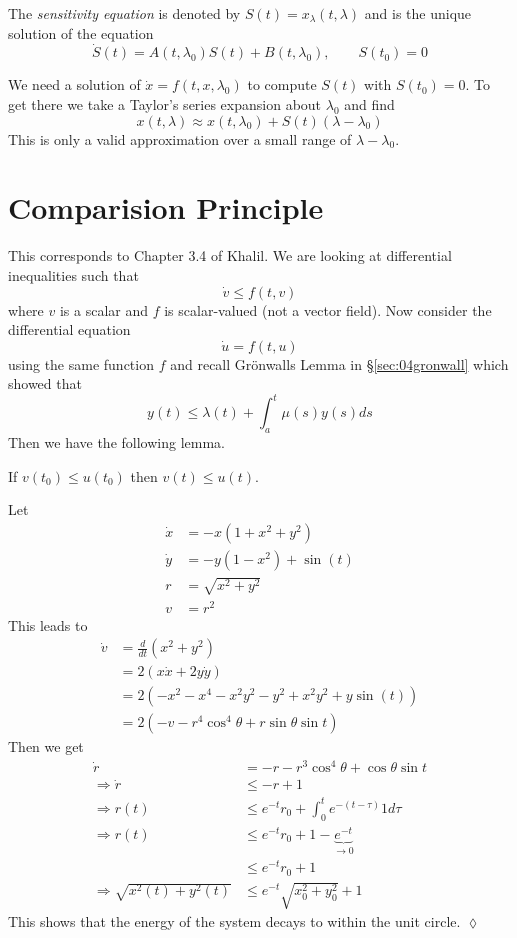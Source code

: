 The \textit{sensitivity equation} is denoted by $S(t) = x_\lambda(t,\lambda)$ and is the unique solution of the equation
$$\dot{S}(t) = A(t,\lambda_0)S(t) + B(t,\lambda_0), \qquad S(t_0) = 0$$

We need a solution of $\dot{x}=f(t,x,\lambda_0)$ to compute $S(t)$ with $S(t_0)=0$. To get there we take a Taylor's series expansion about $\lambda_0$ and find
$$x(t,\lambda) \approx x(t,\lambda_0) + S(t)(\lambda-\lambda_0)$$
This is only a valid approximation over a small range of $\lambda-\lambda_0$.

\section{Comparision Principle}
This corresponds to Chapter 3.4 of Khalil. We are looking at differential inequalities such that
$$\dot{v}\leq f(t,v)$$
where $v$ is a scalar and $f$ is scalar-valued (not a vector field). Now consider the differential equation
$$\dot{u} = f(t,u)$$
using the same function $f$ and recall Gr\"onwalls Lemma in \S\ref{sec:04gronwall} which showed that
$$y(t) \leq \lambda(t) + \int_a^t\mu(s)y(s)ds$$
Then we have the following lemma.

\begin{lemma}
If $v(t_0)\leq u(t_0)$ then $v(t)\leq u(t)$.
\end{lemma}

\begin{example}
Let
\begin{align*}
\dot{x} &= -x(1+x^2+y^2) \\
\dot{y} &= -y(1-x^2)+\sin(t) \\
r &= \sqrt{x^2+y^2} \\
v &= r^2
\end{align*}
This leads to
\begin{align*}
\dot{v} &= \frac{d}{dt}(x^2+y^2) \\
&= 2(x\dot{x}+2y\dot{y}) \\
&= 2(-x^2-x^4-x^2y^2-y^2+x^2y^2+y\sin(t)) \\
&= 2(-v-r^4\cos^4\theta+r\sin\theta\sin t)
\end{align*}
Then we get
\begin{align*}
\dot{r} &= -r-r^3\cos^4\theta+\cos\theta\sin t \\
\Rightarrow \dot{r} &\leq -r+1 \\
\Rightarrow r(t) &\leq e^{-t}r_0 + \int_0^t e^{-(t-\tau)}1d\tau \\
\Rightarrow r(t) &\leq e^{-t}r_0 + 1 - \underbrace{e^{-t}}_{\to0} \\
&\leq e^{-t}r_0 + 1 \\
\Rightarrow \sqrt{x^2(t)+y^2(t)} &\leq e^{-t}\sqrt{x_0^2+y_0^2} + 1
\end{align*}
This shows that the energy of the system decays to within the unit circle.
$\lozenge$
\end{example}
